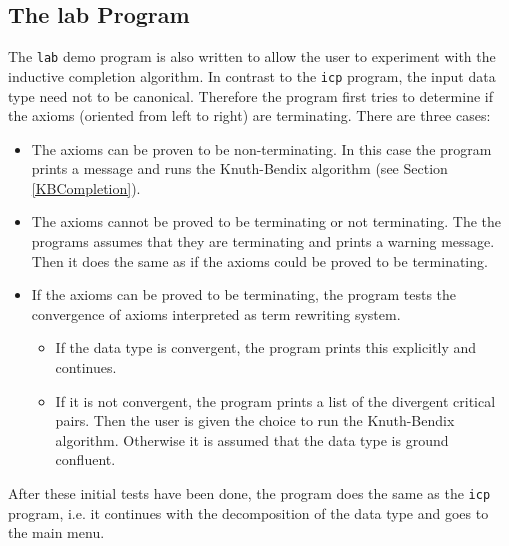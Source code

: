 \subsection{The lab Program}
The {\tt lab} demo program is also written to allow the user to experiment with 
the inductive completion algorithm. In contrast to the {\tt icp} program,
the input data type need not to be canonical. Therefore the program first
tries to determine if the axioms (oriented from left to right)
are terminating. There are three cases:

\begin{itemize}
\item The axioms can be proven to be non-terminating.
In this case the program prints a message and runs the Knuth-Bendix 
algorithm (see Section \ref{KBCompletion}).

\item The axioms cannot be proved to be terminating or not terminating. 
The the programs assumes
that they are terminating and prints a warning message. Then it does the
same as if the axioms could be proved to be terminating.

\item If the axioms can be proved to be terminating, the program tests
the convergence of axioms interpreted as term rewriting system.

\begin{itemize}
\item 
If the data type is convergent, the program prints this explicitly and
continues. 

\item If it is not convergent, the program 
prints a list of the divergent critical pairs.
Then the user is given the choice to run the Knuth-Bendix algorithm.
Otherwise it is assumed that the data type is ground confluent.
\end{itemize}
\end{itemize}

After these initial tests have been done, the program does the same as
the {\tt icp} program, i.e. it continues with the decomposition of the 
data type and goes to the main menu.
